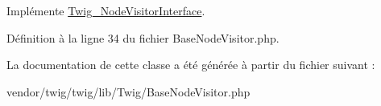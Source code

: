 Implémente \hyperlink{interface_twig___node_visitor_interface_a436bb1ae16511148e860e5cfa2cad88f}{Twig\+\_\+\+Node\+Visitor\+Interface}.



Définition à la ligne 34 du fichier Base\+Node\+Visitor.\+php.



La documentation de cette classe a été générée à partir du fichier suivant \+:\begin{DoxyCompactItemize}
\item 
vendor/twig/twig/lib/\+Twig/Base\+Node\+Visitor.\+php\end{DoxyCompactItemize}
